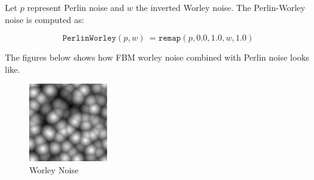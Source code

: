 Let \( p \) represent Perlin noise and \( w \) the inverted Worley noise. The Perlin-Worley noise is computed as:
\begin{definition}
    \[
    \texttt{PerlinWorley}(p, w)\ = \texttt{remap}(p, 0.0, 1.0, w, 1.0) 
    \]
\end{definition}

The figures below shows how FBM worley noise combined with Perlin noise looks like.

\begin{figure}[H]
    \centering
    \begin{minipage}[t]{0.32\textwidth}
        \centering
        \includegraphics[width=\linewidth]{images/pure_worley.png}
        \caption{Worley Noise}
        \label{fig:pure_worley}
    \end{minipage}
    \hfill
    \begin{minipage}[t]{0.32\textwidth}
        \centering

\end{minipage}
\end{figure}
